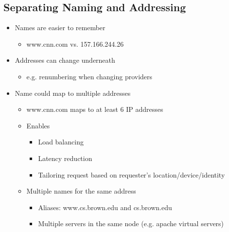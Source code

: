 \subsection{Separating Naming and Addressing}
\begin{itemize}[nosep]
    \item Names are easier to remember
          \begin{itemize}[nosep]
              \item www.cnn.com vs. 157.166.244.26
          \end{itemize}
    \item Addresses can change underneath
          \begin{itemize}[nosep]
              \item e.g. renumbering when changing providers
          \end{itemize}
    \item Name could map to multiple addresses
          \begin{itemize}[nosep]
              \item www.cnn.com maps to at least 6 IP addresses
              \item Enables
                    \begin{itemize}[nosep]
                        \item Load balancing
                        \item Latency reduction
                        \item Tailoring request based on requester's location/device/identity
                    \end{itemize}
              \item Multiple names for the same address
                    \begin{itemize}[nosep]
                        \item Aliases: www.cs.brown.edu and cs.brown.edu
                        \item Multiple servers in the same node (e.g. apache virtual servers)
                    \end{itemize}
          \end{itemize}
\end{itemize}
